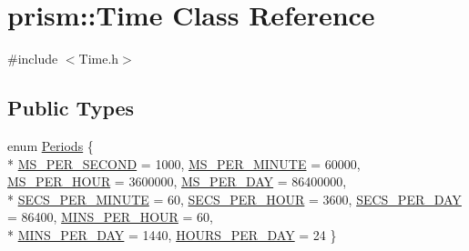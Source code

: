 \hypertarget{classprism_1_1_time}{}\section{prism\+:\+:Time Class Reference}
\label{classprism_1_1_time}


{\ttfamily \#include $<$Time.\+h$>$}

\subsection*{Public Types}
\begin{DoxyCompactItemize}
\item 
enum \hyperlink{classprism_1_1_time_abad93f9bcf24f92363779ceea634fba1}{Periods} \{ \\*
\hyperlink{classprism_1_1_time_abad93f9bcf24f92363779ceea634fba1a936aeb84b0e60cf062adb25a35cf2fda}{M\+S\+\_\+\+P\+E\+R\+\_\+\+S\+E\+C\+O\+ND} = 1000, 
\hyperlink{classprism_1_1_time_abad93f9bcf24f92363779ceea634fba1a91c834280bbe9c6ce2ea438f0132ca60}{M\+S\+\_\+\+P\+E\+R\+\_\+\+M\+I\+N\+U\+TE} = 60000, 
\hyperlink{classprism_1_1_time_abad93f9bcf24f92363779ceea634fba1aed67b9c928af60c5cad839b71253ad1c}{M\+S\+\_\+\+P\+E\+R\+\_\+\+H\+O\+UR} = 3600000, 
\hyperlink{classprism_1_1_time_abad93f9bcf24f92363779ceea634fba1aab960bfe4c84e6bd79bd4fd5b038bffd}{M\+S\+\_\+\+P\+E\+R\+\_\+\+D\+AY} = 86400000, 
\\*
\hyperlink{classprism_1_1_time_abad93f9bcf24f92363779ceea634fba1a0e58469de7dd0d126a53b68db3e35ee0}{S\+E\+C\+S\+\_\+\+P\+E\+R\+\_\+\+M\+I\+N\+U\+TE} = 60, 
\hyperlink{classprism_1_1_time_abad93f9bcf24f92363779ceea634fba1a43bac766fad2dce180ae4fff8a66441f}{S\+E\+C\+S\+\_\+\+P\+E\+R\+\_\+\+H\+O\+UR} = 3600, 
\hyperlink{classprism_1_1_time_abad93f9bcf24f92363779ceea634fba1a73e1d097f17207730eb6935270e05c05}{S\+E\+C\+S\+\_\+\+P\+E\+R\+\_\+\+D\+AY} = 86400, 
\hyperlink{classprism_1_1_time_abad93f9bcf24f92363779ceea634fba1a3f4160b1bb1b56fbd23f53e614bd0bad}{M\+I\+N\+S\+\_\+\+P\+E\+R\+\_\+\+H\+O\+UR} = 60, 
\\*
\hyperlink{classprism_1_1_time_abad93f9bcf24f92363779ceea634fba1a890a5f1d86e152fc8c5d3ca4b6673207}{M\+I\+N\+S\+\_\+\+P\+E\+R\+\_\+\+D\+AY} = 1440, 
\hyperlink{classprism_1_1_time_abad93f9bcf24f92363779ceea634fba1a2321329da5265ab087381f8c0483403e}{H\+O\+U\+R\+S\+\_\+\+P\+E\+R\+\_\+\+D\+AY} = 24
 \}
\end{DoxyCompactItemize}
